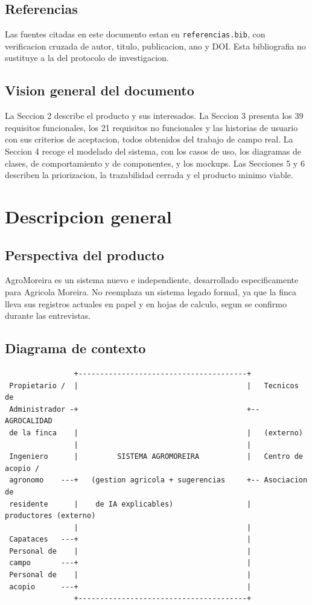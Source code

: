\documentclass[11pt,a4paper]{article}
\newcommand{\ruta}[1]{\texttt{#1}}
\begin{document}
\subsection{Referencias}

Las fuentes citadas en este documento estan en \ruta{referencias.bib}, con verificacion cruzada de autor, titulo, publicacion, ano y DOI. Esta bibliografia no sustituye a la del protocolo de investigacion.

\subsection{Vision general del documento}

La Seccion 2 describe el producto y sus interesados. La Seccion 3 presenta los 39 requisitos funcionales, los 21 requisitos no funcionales y las historias de usuario con sus criterios de aceptacion, todos obtenidos del trabajo de campo real. La Seccion 4 recoge el modelado del sistema, con los casos de uso, los diagramas de clases, de comportamiento y de componentes, y los mockups. Las Secciones 5 y 6 describen la priorizacion, la trazabilidad cerrada y el producto minimo viable.

\section{Descripcion general}

\subsection{Perspectiva del producto}

AgroMoreira es un sistema nuevo e independiente, desarrollado especificamente para Agricola Moreira. No reemplaza un sistema legado formal, ya que la finca lleva sus registros actuales en papel y en hojas de calculo, segun se confirmo durante las entrevistas.

\subsection{Diagrama de contexto}

\begin{verbatim}
                +---------------------------------------+
 Propietario /  |                                       |   Tecnicos de
 Administrador -+                                       +-- AGROCALIDAD
 de la finca    |                                       |   (externo)
                |                                       |
 Ingeniero      |         SISTEMA AGROMOREIRA           |   Centro de acopio /
 agronomo    ---+   (gestion agricola + sugerencias     +-- Asociacion de
 residente      |    de IA explicables)                 |   productores (externo)
                |                                       |
 Capataces   ---+                                       |
 Personal de    |                                       |
 campo       ---+                                       |
 Personal de    |                                       |
 acopio      ---+                                       |
                +---------------------------------------+
\end{verbatim}
\end{document}
